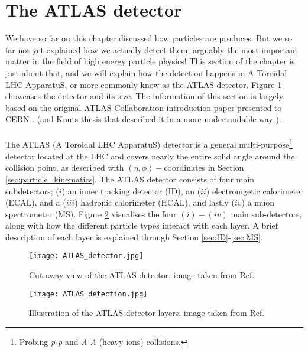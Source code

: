 \documentclass[14pt, a4paper]{book}
\begin{document}
\section{The ATLAS detector}
We have so far on this chapter discussed how particles are produces. But we so far not yet explained how we actually detect them, arguably the most important matter in the field of high energy particle physics!
This section of the chapter is just about that, and we will explain how the detection happens in A Toroidal LHC ApparatuS, or more commonly know as the ATLAS detector. Figure \ref{fig:ATLAS_detector} showcases 
the detector and its size. The information of this section is largely based on the original ATLAS Collaboration introduction paper presented to CERN 
\cite{Aad:1129811}. (and Knuts thesis \cite{KNUT_VADLA} that described it in a more undertandable way ). \\
\\The ATLAS (A Toroidal LHC ApparatuS) detector is a general multi-purpose\footnote{Probing \textit{p-p} and \textit{A-A} (heavy ions) collisions.} detector located at the LHC and covers nearly the entire solid angle 
around the collision point, as described with $(\eta,\phi)-$coordinates in Section \ref{sec:particle_kinematics}. The ATLAS detector consists of four main subdetectors; ($i$) an inner tracking detector (ID), 
an ($ii$) electromgetic calorimeter (ECAL), and a ($iii$) hadronic calorimeter (HCAL), and lastly ($iv$) a muon spectrometer (MS). Figure \ref{fig:ATLAS_layers} visualises the four $(i)-(iv)$ main sub-detectors, 
along with how the different particle types interact with each layer. A brief description of each layer is explained through Section \ref{sec:ID}-\ref{sec:MS}.
\graphicspath{{../../figures/}}
\begin{figure}[!ht]
	\centering
    \texttt{[image: ATLAS\_detector.jpg]}
    \caption[The ATLAS detector]{Cut-away view of the ATLAS detector, image taken from Ref. \cite{Aad:1129811}}\label{fig:ATLAS_detector}
\end{figure}
\begin{figure}[!ht]
	\centering
    \texttt{[image: ATLAS\_detection.jpg]}
    \caption[Illustration of the ATLAS detector layers]{Illustration of the ATLAS detector layers, image taken from Ref. \cite{Pequenao:1505342}}\label{fig:ATLAS_layers}
\end{figure}
\end{document}
